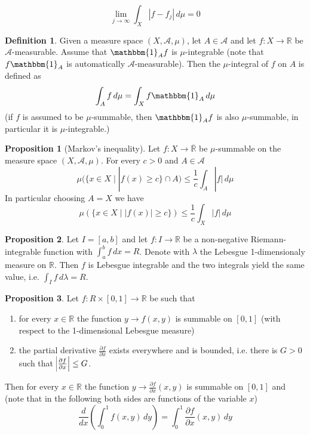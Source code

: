 \documentclass[a4paper,14pt]{extarticle}
\theoremstyle{definition}
\newtheorem{definition}{Definition}
\newtheorem{proposition}{Proposition}
\begin{document}
\[\lim\limits_{j\to\infty}\int_X |f-f_j| \,d\mu=0\]
\begin{definition}
  Given a measure space $(X,\mathcal{A},\mu)$, let $A\in\mathcal{A}$ and let $f:X\rightarrow\mathbb{R}$ be $\mathcal{A}$-measurable. Assume that $\mathbbm{1}_A f$ is $\mu$-integrable (note that $f\mathbbm{1}_A$ is automatically $\mathcal{A}$-measurable). Then the $\mu$-integral of $f$ on $A$ is defined as \[\int_A f \,d\mu=\int_X f\mathbbm{1}_A \,d\mu\] (if $f$ is assumed to be $\mu$-summable, then $\mathbbm{1}_A f$ is also $\mu$-summable, in particular it is $\mu$-integrable.)
\end{definition}
\begin{proposition}[Markov's inequality]
  Let $f:X\rightarrow\overline{\mathbb{R}}$ be $\mu$-summable on the measure space $(X,\mathcal{A},\mu)$. For every $c>0$ and $A\in\mathcal{A}$
  \[\mu(\{x\in X\mid|f(x)\geq c\}\cap A)\leq\frac{1}{c}\int_A |f| \,d\mu\] In particular choosing $A=X$ we have 
  \[\mu(\{x\in X\mid |f(x)|\geq c\})\leq \frac{1}{c}\int_X |f| \,d\mu\]
\end{proposition}
\begin{proposition}
  Let $I=[a,b]$ and let $f:I\rightarrow\mathbb{R}$ be a non-negative Riemann-integrable function with $\int_a^b f \,dx=R$. Denote with $\lambda$ the Lebesgue 1-dimensionaly measure on $\mathbb{R}$. Then $f$ is Lebesgue integrable and the two integrals yield the same value, i.e. $\int_I f \,d\lambda=R$.
\end{proposition}
\begin{proposition}
  Let $f:R\times[0,1]\rightarrow\mathbb{R}$ be such that 
  \begin{enumerate}
    \item for every $x\in\mathbb{R}$ the function $y\rightarrow f(x,y)$ is summable on $[0,1]$ (with respect to the 1-dimensional Lebesgue measure)
    \item the partial derivative $\frac{\partial f}{\partial x}$ exists everywhere and is bounded, i.e. there is $G>0$ such that $\abs{\frac{\partial f}{\partial x}}\leq G$.
  \end{enumerate}
  Then for every $x\in\mathbb{R}$ the function $y\rightarrow\frac{\partial f}{\partial x}(x,y)$ is summable on $[0,1]$ and (note that in the following both sides are functions of the variable $x$)
  \[\frac{d}{dx}\left(\int_0^1 f(x,y) \,dy\right)=\int_0^1\frac{\partial f}{\partial x}(x,y) \,dy\]
\end{proposition}
\newpage
\end{document}
